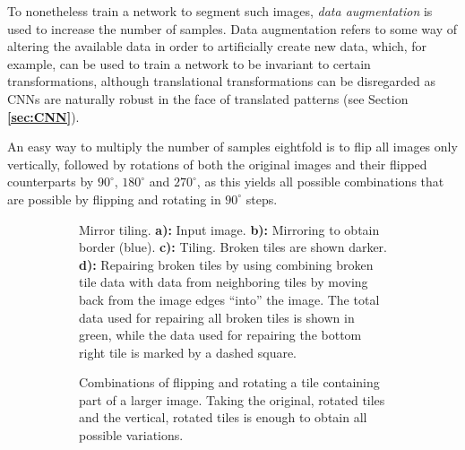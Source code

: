 To nonetheless train a network to segment such images, \textit{data augmentation} is used to increase the number of samples. Data augmentation refers to some way of altering the available data in order to artificially create new data, which, for example, can be used to train a network to be invariant to certain transformations, although translational transformations can be disregarded as CNNs are naturally robust in the face of translated patterns (see Section \textbf{\ref{sec:CNN}}).

An easy way to multiply the number of samples eightfold is to flip all images only vertically, followed by rotations of both the original images and their flipped counterparts by $90^{\circ}$, $180^{\circ}$ and $270^{\circ}$, as this yields all possible combinations that are possible by flipping and rotating in $90^{\circ}$ steps.\\


\begin {figure}[!ht]
	\begin {subfigure}[t]{0.5\linewidth}
		\scalebox{0.5}{}

		\caption*{Mirror tiling. \textbf{a):} Input image. \textbf{b):} Mirroring to obtain border (blue). \textbf{c):} Tiling. Broken tiles are shown darker. \textbf{d):} Repairing broken tiles by using combining broken tile data with data from neighboring tiles by moving back from the image edges ``into'' the image. The total data used for repairing all broken tiles is shown in green, while the data used for repairing the bottom right tile is marked by a dashed square.}
	\end {subfigure}
	\hspace{1cm}
	\begin {subfigure}[t]{0.5\linewidth}
		\scalebox{0.5}{}

		\caption*{Combinations of flipping and rotating a tile containing part of a larger image. Taking the original, rotated tiles and the vertical, rotated tiles is enough to obtain all possible variations.}
	\end {subfigure}

		\caption[Mirror tiling and rotating.]{}
		\label{fig:tile_mirror_rotate}

\end {figure}


